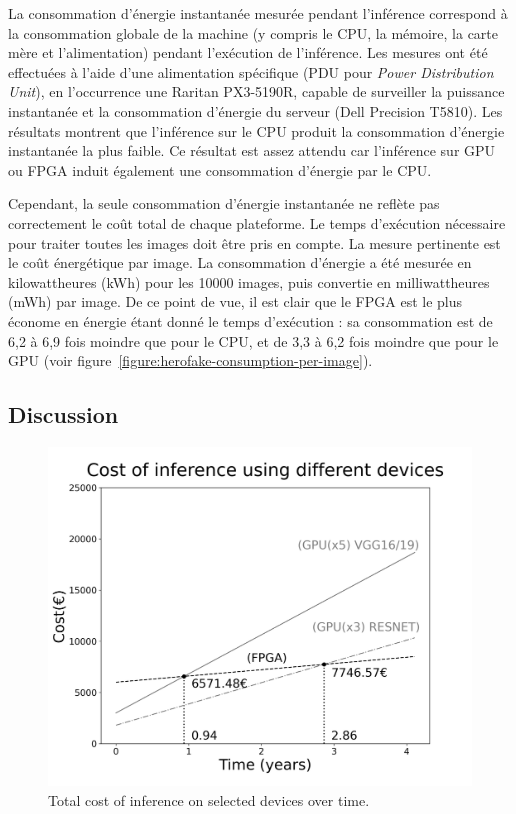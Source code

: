 La consommation d'énergie instantanée mesurée pendant l'inférence correspond à la consommation globale de la machine (y compris le CPU, la mémoire, la carte mère et l'alimentation) pendant l'exécution de l'inférence.
Les mesures ont été effectuées à l'aide d'une alimentation spécifique (PDU pour \textit{Power Distribution Unit}), en l'occurrence une Raritan PX3-5190R, capable de surveiller la puissance instantanée et la consommation d'énergie du serveur (Dell Precision T5810). Les résultats montrent que l'inférence sur le CPU produit la consommation d'énergie instantanée la plus faible. Ce résultat est assez attendu car l'inférence sur GPU ou FPGA induit également une consommation d'énergie par le CPU.

Cependant, la seule consommation d'énergie instantanée ne reflète pas correctement le coût total de chaque plateforme. Le temps d'exécution nécessaire pour traiter toutes les images doit être pris en compte. La mesure pertinente est le coût énergétique par image. La consommation d'énergie a été mesurée en kilowattheures (kWh) pour les 10000 images, puis convertie en milliwattheures (mWh) par image. De ce point de vue, il est clair que le FPGA est le plus économe en énergie étant donné le temps d'exécution : sa consommation est de 6,2 à 6,9 fois moindre que pour le CPU, et de 3,3 à 6,2 fois moindre que pour le GPU (voir figure~\ref{figure:herofake-consumption-per-image}).

\subsection{Discussion}

\begin{figure}[!ht]
    \centering
    \includegraphics[width=\textwidth]{4_Chapitre4/figures/characterization/cost_devices_time.png}
    \caption{Total cost of inference on selected devices over time.}
    \label{figure:herofake-cost-over-time}
\end{figure}

